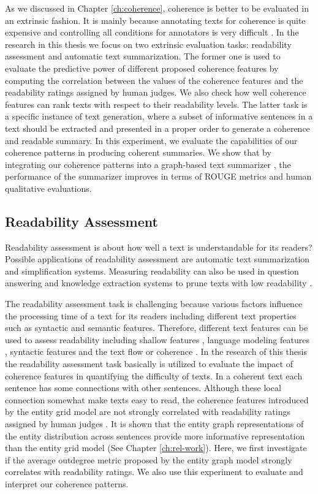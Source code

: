 As we discussed in Chapter \ref{ch:coherence}, coherence is better to be evaluated in an extrinsic fashion. 
It is mainly because annotating texts for coherence is quite expensive and controlling all conditions for annotators is very difficult \cite{karamanis04a}. 
In the research in this thesis we focus on two extrinsic evaluation tasks: readability assessment and automatic text summarization. 
The former one is used to evaluate the predictive power of different proposed coherence features by computing the correlation between the values of the coherence features and the readability ratings assigned by human judges. 
We also check how well coherence features can rank texts with respect to their readability levels. 
The latter task is a specific instance of text generation, where a subset of informative sentences in a text should be extracted and presented in a proper order to generate a coherence and readable summary. 
In this experiment, we evaluate the capabilities of our coherence patterns in producing coherent summaries. 
We show that by integrating our coherence patterns into a graph-based text summarizer \cite{parveen15a}, the performance of the summarizer improves in terms of ROUGE metrics and human qualitative evaluations.

\subsection{Readability Assessment}
\label{sec:readability_assessment}

Readability assessment is about how well a text is understandable for its readers? 
Possible applications of readability assessment are automatic text summarization and simplification systems. 
Measuring readability can also be used in question answering and knowledge extraction systems to prune texts with low readability \cite{kate10}. 

The readability assessment task is challenging because various factors influence the processing time of a text for its readers including different text properties such as syntactic and semantic features.
Therefore, different text features can be used to assess readability including shallow features \cite{flesch48,kincaid75}, language modeling features \cite{siluo01,collins-thompson04}, syntactic features \cite{schwarm05} and the text flow or coherence \cite{barzilay08,pitler08}.
In the research of this thesis the readability assessment task basically is utilized to evaluate the impact of coherence features in quantifying the difficulty of texts.  
In a coherent text each sentence has some connections with other sentences. 
Although these local connection somewhat make texts easy to read, the coherence features introduced by the entity grid model \cite{barzilay08} are not strongly correlated with readability ratings assigned by human judges \cite{pitler08}.  
It is shown that the entity graph representations of the entity distribution across sentences provide more informative representation than the entity grid model (See Chapter \ref{ch:rel-work}).  
Here, we first investigate if the average outdegree metric proposed by the entity graph model strongly correlates with readability ratings. 
We also use this experiment to evaluate and interpret our coherence patterns. 

